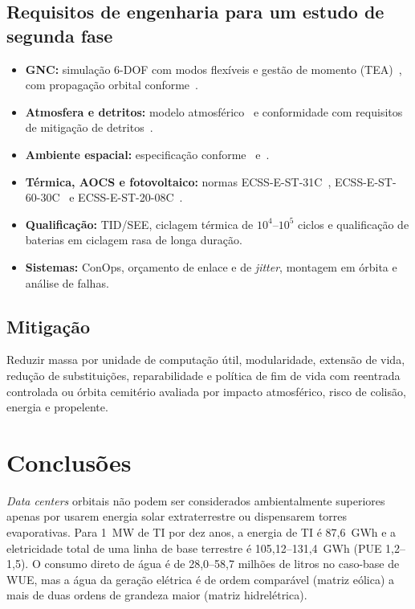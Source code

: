 \documentclass[11pt,a4paper]{article}
\begin{document}
\subsection{Requisitos de engenharia para um estudo de segunda fase}
\begin{itemize}
  \item \textbf{GNC:} simulação 6-DOF com modos flexíveis e gestão de momento
  (TEA)~\cite{r27,r31}, com propagação orbital conforme~\cite{r28}.
  \item \textbf{Atmosfera e detritos:} modelo atmosférico~\cite{r29} e
  conformidade com requisitos de mitigação de detritos~\cite{r43}.
  \item \textbf{Ambiente espacial:} especificação conforme~\cite{r44}
  e~\cite{r48}.
  \item \textbf{Térmica, AOCS e fotovoltaico:} normas
  ECSS-E-ST-31C~\cite{r45}, ECSS-E-ST-60-30C~\cite{r46} e
  ECSS-E-ST-20-08C~\cite{r47}.
  \item \textbf{Qualificação:} TID/SEE, ciclagem térmica de $10^{4}$--$10^{5}$
  ciclos e qualificação de baterias em ciclagem rasa de longa duração.
  \item \textbf{Sistemas:} ConOps, orçamento de enlace e de \emph{jitter},
  montagem em órbita e análise de falhas.
\end{itemize}

\subsection{Mitigação}
Reduzir massa por unidade de computação útil, modularidade, extensão de vida,
redução de substituições, reparabilidade e política de fim de vida com
reentrada controlada ou órbita cemitério avaliada por impacto atmosférico,
risco de colisão, energia e propelente.

\section{Conclusões}

\emph{Data centers} orbitais não podem ser considerados ambientalmente
superiores apenas por usarem energia solar extraterrestre ou dispensarem torres
evaporativas. Para 1~MW de TI por dez anos, a energia de TI é 87,6~GWh e a
eletricidade total de uma linha de base terrestre é 105,12--131,4~GWh (PUE
1,2--1,5). O consumo direto de água é de 28,0--58,7 milhões de litros no
caso-base de WUE, mas a água da geração elétrica é de ordem comparável (matriz
eólica) a mais de duas ordens de grandeza maior (matriz hidrelétrica).
\end{document}
